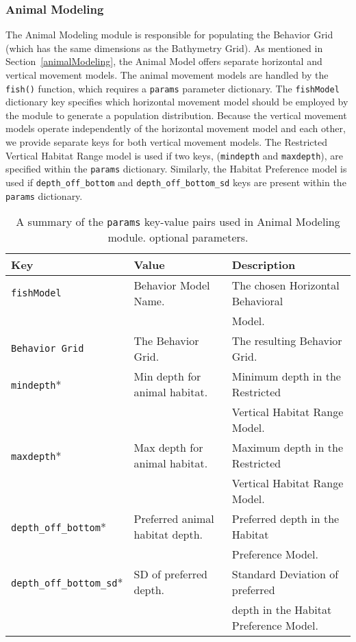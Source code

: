 \subsubsection{Animal Modeling}
The Animal Modeling module is responsible for populating the Behavior Grid (which has the same dimensions as the Bathymetry Grid).  As mentioned in Section~\ref{animalModeling}, the Animal Model offers separate horizontal and vertical movement models.  The animal movement models are handled by the \texttt{fish()} function, which requires a \texttt{params} parameter dictionary.  The \texttt{fishModel} dictionary key specifies which horizontal movement model should be employed by the module to generate a population distribution.  Because the vertical movement models operate independently of the horizontal movement model and each other, we provide separate keys for both vertical movement models.  The Restricted Vertical Habitat Range model is used if two keys, (\texttt{mindepth} and \texttt{maxdepth}), are specified within the \texttt{params} dictionary.  Similarly, the Habitat Preference model is used if \texttt{depth\_off\_bottom} and \texttt{depth\_off\_bottom\_sd} keys are present within the \texttt{params} dictionary.

\begin{table}[ht]
	\begin{tabular}{l l l}
		Key									&	Value 							&	Description\\
		\hline
		\texttt{fishModel}					& 	Behavior Model Name.			&	The chosen Horizontal Behavioral\\
					 						&									&    Model.\\
		\texttt{Behavior Grid}				&	The Behavior Grid.				&	The resulting Behavior Grid.\\
		\texttt{mindepth}*					& 	Min depth for animal habitat.	&	Minimum depth in the Restricted\\
					 						&									&   Vertical Habitat Range Model.\\
		\texttt{maxdepth}*					& 	Max depth for animal habitat.	&	Maximum depth in the Restricted\\
					 						&									&   Vertical Habitat Range Model.\\
		\texttt{depth\_off\_bottom}*		& 	Preferred animal habitat depth.	&   Preferred depth in the Habitat\\
					 						&									&   Preference Model.\\
		\texttt{depth\_off\_bottom\_sd}*	& 	SD of preferred depth.			&   Standard Deviation of preferred\\
					 						&									&   depth in the Habitat Preference Model.\\
	\end{tabular}
	\caption{A summary of the \texttt{params} key-value pairs used in Animal Modeling module.  \newline * optional parameters.
		\label{animalParams}}
\end{table}

